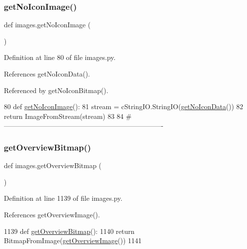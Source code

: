 \mbox{\label{namespaceimages_ade43d1cef58e60dc22e5fe7728b200e6}} 
\subsubsection{\texorpdfstring{get\+No\+Icon\+Image()}{getNoIconImage()}}
{\footnotesize\ttfamily def images.\+get\+No\+Icon\+Image (\begin{DoxyParamCaption}{ }\end{DoxyParamCaption})}



Definition at line 80 of file images.\+py.



References get\+No\+Icon\+Data().



Referenced by get\+No\+Icon\+Bitmap().


\begin{DoxyCode}
80 \textcolor{keyword}{def }\hyperlink{namespaceimages_ade43d1cef58e60dc22e5fe7728b200e6}{getNoIconImage}():
81     stream = cStringIO.StringIO(\hyperlink{namespaceimages_a7b9770da476a15556498ad493df6abb4}{getNoIconData}())
82     \textcolor{keywordflow}{return} ImageFromStream(stream)
83 
84 \textcolor{comment}{#----------------------------------------------------------------------}
\end{DoxyCode}
\mbox{\label{namespaceimages_a92263497d1b03c4d370a88e7cf5f38d0}} 
\subsubsection{\texorpdfstring{get\+Overview\+Bitmap()}{getOverviewBitmap()}}
{\footnotesize\ttfamily def images.\+get\+Overview\+Bitmap (\begin{DoxyParamCaption}{ }\end{DoxyParamCaption})}



Definition at line 1139 of file images.\+py.



References get\+Overview\+Image().


\begin{DoxyCode}
1139 \textcolor{keyword}{def }\hyperlink{namespaceimages_a92263497d1b03c4d370a88e7cf5f38d0}{getOverviewBitmap}():
1140     \textcolor{keywordflow}{return} BitmapFromImage(\hyperlink{namespaceimages_a3f687e69d4a1d3e3557513c673a4a91c}{getOverviewImage}())
1141 
\end{DoxyCode}
\mbox{\label{namespaceimages_ac431d64f5cb525f4d569389b880983b9}} 
